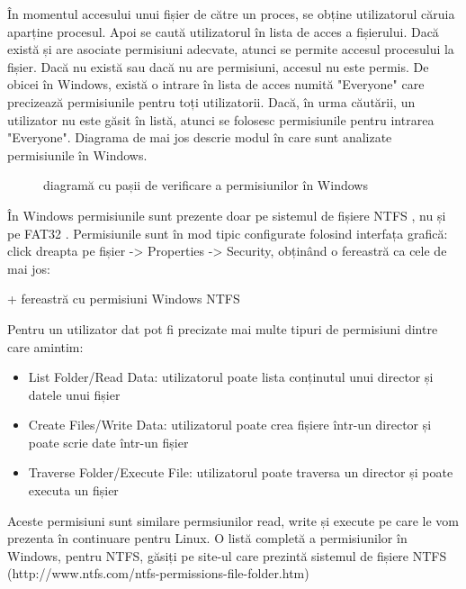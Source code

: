 În momentul accesului unui fișier de către un proces, se obține utilizatorul
căruia aparține procesul. Apoi se caută utilizatorul în lista de acces a
fișierului. Dacă există și are asociate permisiuni adecvate, atunci se permite
accesul procesului la fișier. Dacă nu există sau dacă nu are permisiuni, accesul
nu este permis. De obicei în Windows, există o intrare în lista de acces numită
"Everyone" care precizează permisiunile pentru toți utilizatorii. Dacă, în urma
căutării, un utilizator nu este găsit în listă, atunci se folosesc permisiunile
pentru intrarea "Everyone". Diagrama de mai jos descrie modul în care sunt
analizate permisiunile în Windows.

\begin{figure}[htbp]
	\centering
	\def\svgwidth{\columnwidth}
	
	\caption{diagramă cu pașii de verificare a permisiunilor în Windows}
	\label{fig:user-check-perm}
\end{figure}

În Windows permisiunile sunt prezente doar pe sistemul de fișiere NTFS
, nu și pe FAT32 . Permisiunile sunt în mod tipic configurate folosind
interfața grafică: click dreapta pe fișier -> Properties -> Security, obținând o
fereastră ca cele de mai jos:

+ fereastră cu permisiuni Windows NTFS

Pentru un utilizator dat pot fi precizate mai multe tipuri de permisiuni dintre
care amintim:

\begin{itemize}
	\item List Folder/Read Data: utilizatorul poate lista conținutul unui
		director și datele unui fișier
	\item Create Files/Write Data: utilizatorul poate crea fișiere într-un
		director și poate scrie date într-un fișier
	\item Traverse Folder/Execute File: utilizatorul poate traversa un
		director și poate executa un fișier
\end{itemize}

Aceste permisiuni sunt similare permsiunilor read, write și execute pe care le
vom prezenta în continuare pentru Linux. O listă completă a permisiunilor în
Windows, pentru NTFS, găsiți pe site-ul care prezintă sistemul de fișiere NTFS
(http://www.ntfs.com/ntfs-permissions-file-folder.htm)


